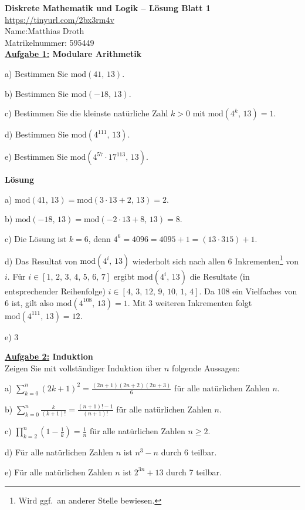 \documentclass[]{article}
\begin{document}
{\Large\bf Diskrete Mathematik und Logik -- Lösung Blatt 1}\\%
\url{https://tinyurl.com/2bx3rm4v}\\
$\text{}$\hspace{12cm}Name:\hspace{1.82cm}Matthias Droth\\
$\text{}$\hspace{12cm}Matrikelnummer: 595449\\
{\bf\underline{Aufgabe 1:} Modulare Arithmetik}\\[-0.8cm]
\begin{list}{}{}
\item[a)]
Bestimmen Sie $\text{mod}(41,\,13)$.
\item[b)]
Bestimmen Sie $\text{mod}(-18,\,13)$.
\item[c)]
Bestimmen Sie die kleinste natürliche Zahl $k>0$ mit $\text{mod}(4^k,\,13)=1$.
\item[d)]
Bestimmen Sie $\text{mod}(4^{111},\,13)$.
\item[e)]
Bestimmen Sie $\text{mod}(4^{57}\cdot17^{113},\,13)$.
\end{list}
{\bf Lösung}\\[-0.8cm]
\begin{list}{}{}
\item[a)]
$\text{mod}(41,\,13)=\text{mod}(3\cdot13+2,\,13)=2$.
\item[b)]
$\text{mod}(-18,\,13)=\text{mod}(-2\cdot13+8,\,13)=8$.
\item[c)]
Die Lösung ist $k=6$, denn $4^6=4096=4095+1=(13\cdot315)+1$.
\item[d)]
Das Resultat von $\text{mod}(4^i,\,13)$ wiederholt sich nach allen 6 Inkrementen\footnote{Wird ggf.~an anderer Stelle bewiesen.} von $i$. Für $i\in[1,\,2,\,3,\,4,\,5,\,6,\,7]$ ergibt $\text{mod}(4^i,\,13)$ die Resultate (in entsprechender Reihenfolge) $i\in[4,\,3,\,12,\,9,\,10,\,1,\,4]$. Da $108$ ein Vielfaches von $6$ ist, gilt also $\text{mod}(4^{108},\,13)=1$. Mit 3 weiteren Inkrementen folgt $\text{mod}(4^{111},\,13)=12$.
\item[e)]
3
\end{list}
{\bf\underline{Aufgabe 2:} Induktion}\\[+0.3cm]
Zeigen Sie mit vollständiger Induktion über $n$ folgende Aussagen:\\[-0.8cm]
\begin{list}{}{}
\item[a)]
$\sum_{k=0}^n(2k{+}1)^2=\frac{(2n+1)(2n+2)(2n+3)}{6}$ für alle natürlichen Zahlen $n$.
\item[b)]
$\sum_{k=0}^n\frac{k}{(k+1)!}=\frac{(n+1)!-1}{(n+1)!}$ für alle natürlichen Zahlen $n$.
\item[c)]
$\prod_{k=2}^n\left(1-\frac{1}{k}\right)=\frac{1}{n}$ für alle natürlichen Zahlen $n\geq2$.
\item[d)]
Für alle natürlichen Zahlen $n$ ist $n^3-n$ durch 6 teilbar.
\item[e)]
Für alle natürlichen Zahlen $n$ ist $2^{3n}+13$ durch 7 teilbar.
\end{list}
\end{document}
